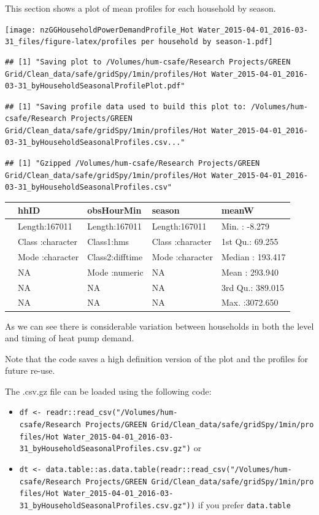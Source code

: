 \documentclass[]{article}
\providecommand{\tightlist}{%
  \setlength{\itemsep}{0pt}\setlength{\parskip}{0pt}}
\begin{document}
This section shows a plot of mean profiles for each household by season.

\texttt{[image: nzGGHouseholdPowerDemandProfile\_Hot Water\_2015-04-01\_2016-03-31\_files/figure-latex/profiles per household by season-1.pdf]}

\begin{verbatim}
## [1] "Saving plot to /Volumes/hum-csafe/Research Projects/GREEN Grid/Clean_data/safe/gridSpy/1min/profiles/Hot Water_2015-04-01_2016-03-31_byHouseholdSeasonalProfilePlot.pdf"
\end{verbatim}

\begin{verbatim}
## [1] "Saving profile data used to build this plot to: /Volumes/hum-csafe/Research Projects/GREEN Grid/Clean_data/safe/gridSpy/1min/profiles/Hot Water_2015-04-01_2016-03-31_byHouseholdSeasonalProfiles.csv..."
\end{verbatim}

\begin{verbatim}
## [1] "Gzipped /Volumes/hum-csafe/Research Projects/GREEN Grid/Clean_data/safe/gridSpy/1min/profiles/Hot Water_2015-04-01_2016-03-31_byHouseholdSeasonalProfiles.csv"
\end{verbatim}

\begin{longtable}[]{@{}lllll@{}}
\toprule
& hhID & obsHourMin & season & meanW\tabularnewline
\midrule
\endhead
& Length:167011 & Length:167011 & Length:167011 & Min. :
-8.279\tabularnewline
& Class :character & Class1:hms & Class :character & 1st Qu.:
69.255\tabularnewline
& Mode :character & Class2:difftime & Mode :character & Median :
193.417\tabularnewline
& NA & Mode :numeric & NA & Mean : 293.940\tabularnewline
& NA & NA & NA & 3rd Qu.: 389.015\tabularnewline
& NA & NA & NA & Max. :3072.650\tabularnewline
\bottomrule
\end{longtable}

As we can see there is considerable variation between households in both
the level and timing of heat pump demand.

Note that the code saves a high definition version of the plot and the
profiles for future re-use.

The .csv.gz file can be loaded using the following code:

\begin{itemize}
\tightlist
\item
  \texttt{df\ \textless{}-\ readr::read\_csv("/Volumes/hum-csafe/Research\ Projects/GREEN\ Grid/Clean\_data/safe/gridSpy/1min/profiles/Hot\ Water\_2015-04-01\_2016-03-31\_byHouseholdSeasonalProfiles.csv.gz")}
  or
\item
  \texttt{dt\ \textless{}-\ data.table::as.data.table(readr::read\_csv("/Volumes/hum-csafe/Research\ Projects/GREEN\ Grid/Clean\_data/safe/gridSpy/1min/profiles/Hot\ Water\_2015-04-01\_2016-03-31\_byHouseholdSeasonalProfiles.csv.gz"))}
  if you prefer \texttt{data.table}
\end{itemize}
\end{document}
